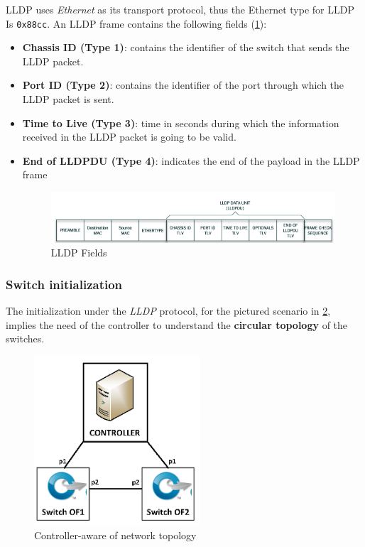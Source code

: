 \documentclass[10pt,a4paper]{report}
\theoremstyle{definition}
\begin{document}
LLDP uses \textit{Ethernet} as its transport protocol, thus the Ethernet type for LLDP Is \texttt{0x88cc}. An LLDP frame contains the following fields (\ref{lldp-frame-fields}):
\begin{itemize}
	\item 
	\textbf{Chassis ID (Type 1)}: contains the identifier of the switch that sends the LLDP packet.
	\item 
	\textbf{Port ID (Type 2)}: contains the identifier of the port through which the LLDP packet is sent.
	\item 
	\textbf{Time to Live (Type 3)}: time in seconds during which the information received in the LLDP packet is going to be valid.
	\item 
	\textbf{End of LLDPDU (Type 4)}: indicates the end of the payload in the LLDP frame
	\begin{figure}[h]
		\centering\includegraphics[scale=0.50]{images/Pasted image 20230329163121.png}
		\caption{LLDP Fields}
	\label{lldp-frame-fields}	
\end{figure}
	
\end{itemize}
\subsubsection{Switch initialization}\label{sec:switch-initialization}
The initialization under the \textit{LLDP} protocol, for the pictured scenario in \ref{controller-eg-1}, implies the need of the controller to understand the \textbf{circular topology} of the switches.
\begin{figure}[h]
	\centering\includegraphics[scale=0.50]{images/Pasted image 20230330100230.png}
	\caption{Controller-aware of network topology}
\label{controller-eg-1}
\end{figure}
\end{document}
